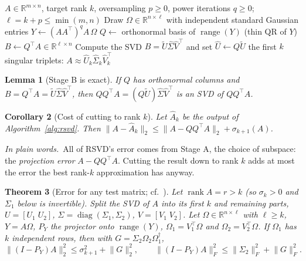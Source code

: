 \documentclass[10pt]{article}
\theoremstyle{plain}
\newtheorem{theorem}{Theorem}[section]
\newtheorem{lemma}[theorem]{Lemma}
\newtheorem{corollary}[theorem]{Corollary}
\theoremstyle{definition}
\theoremstyle{remark}
\newcommand{\R}{\mathbb{R}}
\newcommand{\T}{^{\top}}
\newcommand{\opn}[1]{\lVert #1\rVert_2}
\newcommand{\fro}[1]{\lVert #1\rVert_F}
\DeclareMathOperator{\rank}{rank}
\DeclareMathOperator{\range}{range}
\newcommand{\plain}{\noindent\emph{In plain words.}\ }
\begin{document}
\begin{algorithm}[!tb]
\caption{Randomized SVD (Halko--Martinsson--Tropp \cite{halko2011})}\label{alg:rsvd}
\begin{algorithmic}[1]
\Require $A\in\R^{m\times n}$, target rank $k$, oversampling $p\ge0$, power iterations $q\ge0$; $\ell=k+p\le\min(m,n)$
\State Draw $\Omega\in\R^{n\times\ell}$ with independent standard Gaussian entries 
\State $Y\gets(AA\T)^qA\,\Omega$ 
\State $Q\gets$ orthonormal basis of $\range(Y)$ (thin QR of $Y$)
\State $B\gets Q\T A\in\R^{\ell\times n}$ 
\State Compute the SVD $B=\tilde U\hat\Sigma\hat V\T$ and set $\hat U\gets Q\tilde U$
\State \Return the first $k$ singular triplets: $A\approx\hat U_k\hat\Sigma_k\hat V_k\T$
\end{algorithmic}
\end{algorithm}

\begin{lemma}[Stage B is exact]\label{lem:stageB}
If $Q$ has orthonormal columns and $B=Q\T A=\tilde U\hat\Sigma\hat V\T$, then $QQ\T A=(Q\tilde U)\hat\Sigma\hat V\T$ is an SVD of $QQ\T A$.
\end{lemma}

\begin{corollary}[Cost of cutting to rank $k$]\label{cor:trunc}
Let $\hat A_k$ be the output of Algorithm~\ref{alg:rsvd}. Then $\opn{A-\hat A_k}\le\opn{A-QQ\T A}+\sigma_{k+1}(A)$.
\end{corollary}

\plain All of RSVD's error comes from Stage A, the choice of subspace: the \emph{projection error} $A-QQ\T A$. Cutting the result down to rank $k$ adds at most the error the best rank-$k$ approximation has anyway.

\begin{theorem}[Error for any test matrix; cf.\ {\cite[Thm.~9.1]{halko2011}}]\label{thm:det}
Let $\rank A=r>k$ (so $\sigma_k>0$ and $\Sigma_1$ below is invertible). Split the SVD of $A$ into its first $k$ and remaining parts, $U=[U_1\;U_2]$, $\Sigma=\operatorname{diag}(\Sigma_1,\Sigma_2)$, $V=[V_1\;V_2]$. Let $\Omega\in\R^{n\times\ell}$ with $\ell\ge k$, $Y=A\Omega$, $P_Y$ the projector onto $\range(Y)$, $\Omega_1=V_1\T\Omega$ and $\Omega_2=V_2\T\Omega$. If $\Omega_1$ has $k$ independent rows, then with $G=\Sigma_2\Omega_2\Omega_1^\dagger$,
\[
\opn{(I-P_Y)A}^2\le\sigma_{k+1}^2+\opn{G}^2,\qquad
\fro{(I-P_Y)A}^2\le\fro{\Sigma_2}^2+\fro{G}^2 .
\]
\end{theorem}
\end{document}
